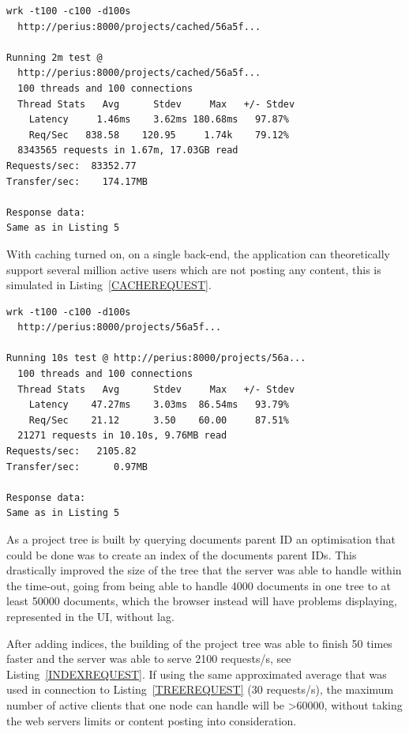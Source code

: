 \documentclass[a4paper,12pt]{article}
\begin{document}
\begin{minipage}{\linewidth-1cm}
\begin{lstlisting}[label=CACHEREQUEST,caption=Result of cached project tree requests]
wrk -t100 -c100 -d100s 
  http://perius:8000/projects/cached/56a5f...
 
Running 2m test @ 
  http://perius:8000/projects/cached/56a5f...
  100 threads and 100 connections
  Thread Stats   Avg      Stdev     Max   +/- Stdev
    Latency     1.46ms    3.62ms 180.68ms   97.87%
    Req/Sec   838.58    120.95     1.74k    79.12%
  8343565 requests in 1.67m, 17.03GB read
Requests/sec:  83352.77
Transfer/sec:    174.17MB

Response data:
Same as in Listing 5
\end{lstlisting}
\end{minipage}

\par
With caching turned on, on a single back-end, the application can theoretically support several 
million active users which are not posting any content, this is simulated in 
Listing~\ref{CACHEREQUEST}.

\begin{minipage}{\linewidth-1cm}
\begin{lstlisting}[label=INDEXREQUEST,caption=Result of indexed project tree requests]
wrk -t100 -c100 -d100s 
  http://perius:8000/projects/56a5f...
 
Running 10s test @ http://perius:8000/projects/56a...
  100 threads and 100 connections
  Thread Stats   Avg      Stdev     Max   +/- Stdev
    Latency    47.27ms    3.03ms  86.54ms   93.79%
    Req/Sec    21.12      3.50    60.00     87.51%
  21271 requests in 10.10s, 9.76MB read
Requests/sec:   2105.82
Transfer/sec:      0.97MB

Response data:
Same as in Listing 5
\end{lstlisting}
\end{minipage}

\par As a project tree is built by querying documents parent ID an optimisation that could be done was
to create an index of the documents parent IDs. This drastically improved the size of the tree that
the server was able to handle within the time-out, going from being able to handle 4000 documents in 
one tree to at least 50000 documents, which the browser instead will have problems displaying, 
represented in the UI, without lag.

\par After adding indices, the building of the project tree was able to finish 50 times faster and
the server was able to serve 2100 requests/s, see Listing~\ref{INDEXREQUEST}. If using the same
approximated average that was used in connection to Listing~\ref{TREEREQUEST} (30 requests/s), the
maximum number of active clients that one node can handle will be >60000, without taking the web
servers limits or content posting into consideration.
\end{document}
